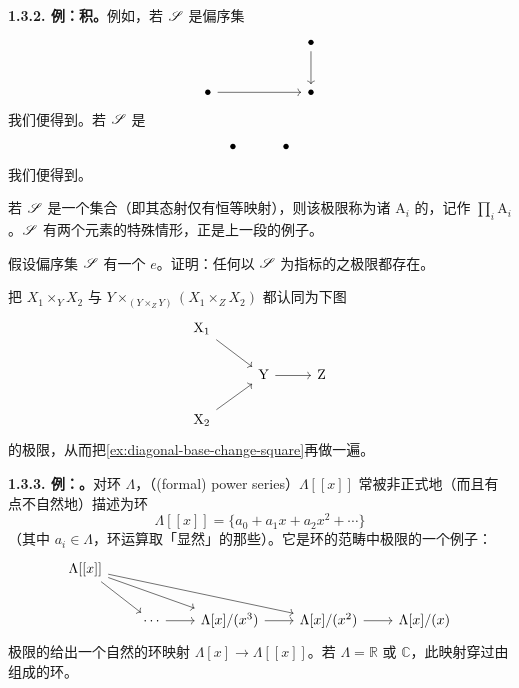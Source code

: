 \textbf{1.3.2. 例：积。}\quad 例如，若 $\mathscr{S}$ 是偏序集
\[
\begin{tikzcd}[row sep=2.4em, column sep=3em]
 & & \bullet \ar[d] \\
\bullet \ar[rr] & & \bullet
\end{tikzcd}
\]
我们便得到\trFiberProduct。若 $\mathscr{S}$ 是
\[
\begin{tikzcd}
\bullet & \bullet
\end{tikzcd}
\]
我们便得到\trProduct。

若 $\mathscr{S}$ 是一个集合（即其态射仅有恒等映射），则该极限称为诸 $\mathrm{A}_i$ 的\trProduct，记作 $\prod_i\mathrm{A}_i$。$\mathscr{S}$ 有两个元素的特殊情形，正是上一段的例子。

\begin{exercise}[现实检验]\label{ex:initial-object-limit}
假设偏序集 $\mathscr{S}$ 有一个\trInitialObject{} $e$。证明：任何以 $\mathscr{S}$ 为指标的\trDiagram{}之极限都存在。
\end{exercise}

\begin{exercise}\label{ex:basechange-diagonal-limit}
把 $X_1\times_Y X_2$ 与 $Y\times_{(Y\times_Z Y)}(X_1\times_Z X_2)$ 都认同为下图
\[
\begin{tikzcd}[row sep=1.8em, column sep=2.6em]
\mathrm{X}_1 \ar[dr] & & \\
 & \mathrm{Y} \ar[r] & \mathrm{Z} \\
\mathrm{X}_2 \ar[ur] & &
\end{tikzcd}
\]
的极限，从而把\cref{ex:diagonal-base-change-square}再做一遍。
\end{exercise}

\textbf{1.3.3. 例：\trFormalPowerSeries。}\quad 对环 $\Lambda$，\textbf{\trFormalPowerSeries}（(formal) power series）$\Lambda[[x]]$ 常被非正式地（而且有点不自然地）描述为环
\[
\Lambda[[x]]=\{a_0+a_1x+a_2x^2+\cdots\}
\]
（其中 $a_i\in\Lambda$，环运算取「显然」的那些）。它是环的范畴中极限的一个例子：
\[
\begin{tikzcd}[row sep=1.9em, column sep=2.1em]
\Lambda[[x]] \ar[dr] \ar[drr] \ar[drrr] & & & & \\
 & \cdots \ar[r] & \Lambda[x]/(x^3) \ar[r] & \Lambda[x]/(x^2) \ar[r] & \Lambda[x]/(x)
\end{tikzcd}
\]
极限的\trUniversalProperty{}给出一个自然的环映射 $\Lambda[x]\to\Lambda[[x]]$。若 $\Lambda=\mathbb{R}$ 或 $\mathbb{C}$，此映射穿过由\trConvergentPowerSeries{}组成的环。

